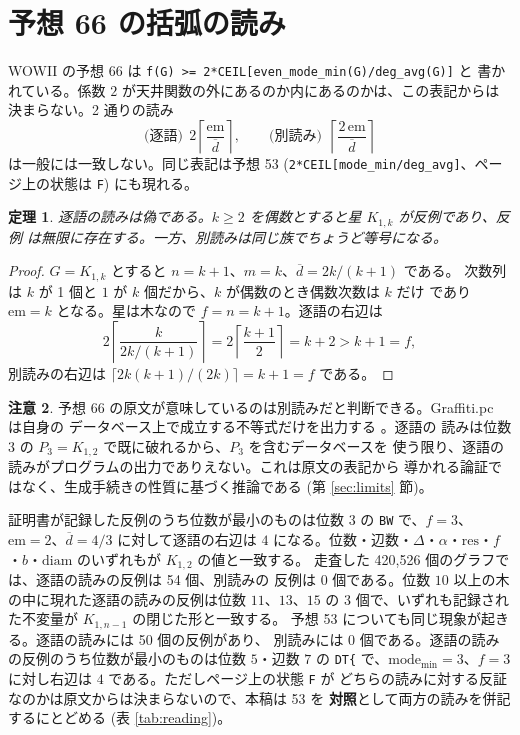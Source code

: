 \documentclass[paper=a4,fontsize=10.5pt,jafontsize=10.5pt]{jlreq}
\theoremstyle{plain}
\newtheorem{theorem}{定理}[section]
\theoremstyle{definition}
\newtheorem{remark}[theorem]{注意}
\begin{document}
\section{予想 66 の括弧の読み}\label{sec:reading}

WOWII の予想 66 は \texttt{f(G) >= 2*CEIL[even\_mode\_min(G)/deg\_avg(G)]} と
書かれている。係数 $2$ が天井関数の外にあるのか内にあるのかは、この表記からは
決まらない。2 通りの読み
\begin{equation}\label{eq:readings}
  \text{(逐語)}\ \ 2\left\lceil \frac{\mathrm{em}}{\overline{d}} \right\rceil,
  \qquad
  \text{(別読み)}\ \ \left\lceil \frac{2\,\mathrm{em}}{\overline{d}}
  \right\rceil
\end{equation}
は一般には一致しない。同じ表記は予想 53
(\texttt{2*CEIL[mode\_min/deg\_avg]}、ページ上の状態は \texttt{F}) にも現れる。

\begin{theorem}\label{thm:66}
逐語の読みは偽である。$k \ge 2$ を偶数とすると星 $K_{1,k}$ が反例であり、反例
は無限に存在する。一方、別読みは同じ族でちょうど等号になる。
\end{theorem}

\begin{proof}
$G = K_{1,k}$ とすると $n = k+1$、$m = k$、$\overline{d} = 2k/(k+1)$ である。
次数列は $k$ が 1 個と $1$ が $k$ 個だから、$k$ が偶数のとき偶数次数は $k$ だけ
であり $\mathrm{em} = k$ となる。星は木なので $f = n = k+1$。逐語の右辺は
\[
  2\left\lceil \frac{k}{2k/(k+1)} \right\rceil
  = 2\left\lceil \frac{k+1}{2} \right\rceil = k + 2 > k + 1 = f,
\]
別読みの右辺は $\lceil 2k(k+1)/(2k) \rceil = k+1 = f$ である。
\end{proof}

\begin{remark}\label{cor:66}
予想 66 の原文が意味しているのは別読みだと判断できる。Graffiti.pc は自身の
データベース上で成立する不等式だけを出力する \cite{wowii, dg2008}。逐語の
読みは位数 3 の $P_3 = K_{1,2}$ で既に破れるから、$P_3$ を含むデータベースを
使う限り、逐語の読みがプログラムの出力でありえない。これは原文の表記から
導かれる論証ではなく、生成手続きの性質に基づく推論である
(第 \ref{sec:limits} 節)。
\end{remark}

証明書が記録した反例のうち位数が最小のものは位数 $3$ の \texttt{BW} で、$f = 3$、$\mathrm{em} = 2$、$\overline{d} = 4/3$ に対して逐語の右辺は $4$ になる。位数・辺数・$\Delta$・$\alpha$・$\mathrm{res}$・$f$・$b$・$\mathrm{diam}$ のいずれもが $K_{1,2}$ の値と一致する。
走査した 420,526 個のグラフでは、逐語の読みの反例は 54 個、別読みの
反例は 0 個である。位数 $10$ 以上の木の中に現れた逐語の読みの反例は位数 $11$、$13$、$15$ の 3 個で、いずれも記録された不変量が $K_{1,n-1}$ の閉じた形と一致する。
予想 53 についても同じ現象が起きる。逐語の読みには 50 個の反例があり、
別読みには 0 個である。逐語の読みの反例のうち位数が最小のものは位数 $5$・辺数 $7$ の \texttt{DT\{} で、$\mathrm{mode_{min}} = 3$、$f = 3$ に対し右辺は $4$ である。ただしページ上の状態 \texttt{F} が
どちらの読みに対する反証なのかは原文からは決まらないので、本稿は 53 を
\textbf{対照}として両方の読みを併記するにとどめる (表 \ref{tab:reading})。
\end{document}

